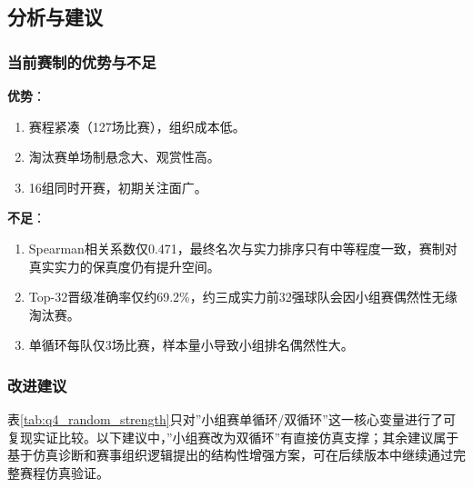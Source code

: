 \documentclass[12pt,a4paper]{article}
\begin{document}
\subsection{分析与建议}

\subsubsection{当前赛制的优势与不足}

\textbf{优势}：
\begin{enumerate}[(1)]
  \item 赛程紧凑（127场比赛），组织成本低。
  \item 淘汰赛单场制悬念大、观赏性高。
  \item 16组同时开赛，初期关注面广。
\end{enumerate}

\textbf{不足}：
\begin{enumerate}[(1)]
  \item Spearman相关系数仅0.471，最终名次与实力排序只有中等程度一致，赛制对真实实力的保真度仍有提升空间。
  \item Top-32晋级准确率仅约69.2\%，约三成实力前32强球队会因小组赛偶然性无缘淘汰赛。
  \item 单循环每队仅3场比赛，样本量小导致小组排名偶然性大。
\end{enumerate}

\subsubsection{改进建议}

表\ref{tab:q4_random_strength}只对”小组赛单循环/双循环”这一核心变量进行了可复现实证比较。以下建议中，”小组赛改为双循环”有直接仿真支撑；其余建议属于基于仿真诊断和赛事组织逻辑提出的结构性增强方案，可在后续版本中继续通过完整赛程仿真验证。
\end{document}
